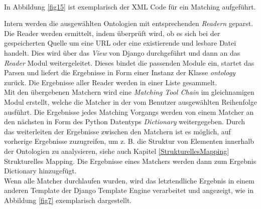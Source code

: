 		\\
		In Abbildung \ref{fig15} ist exemplarisch der XML Code für ein Matching
		aufgeführt.\\
		\begin{minipage}{\linewidth}
			\label{fig15}  
		\end{minipage}
		
		\pagebreak[4]
		
		Intern werden die ausgewählten Ontologien mit entsprechenden
		\textit{Readern} geparst. Die Reader werden ermittelt, indem überprüft wird,
		ob es sich bei der gespeicherten Quelle um eine URL oder eine
		existierende und lesbare Datei handelt. Dies wird über das \textit{View} von
		Django durchgeführt und dann an das \textit{Reader} Modul weitergeleitet. Dieses
		bindet die passenden Module ein, startet das Parsen und liefert die Ergebnisse
		in Form einer Instanz der Klasse \textit{ontology} zurück. Die Ergebnisse
		aller Reader werden in einer Liste gesammelt.\\
		Mit den übergebenen Matchern wird eine \textit{Matching Tool Chain} im
		gleichnamigen Modul erstellt, welche die Matcher in der vom
		Benutzer ausgewählten Reihenfolge ausführt. Die Ergebnisse jedes Matching
		Vorgangs werden von einem Matcher an den nächsten in Form des Python Datentyps \textit{Dictionary}
		weitergegeben. Durch das weiterleiten der Ergebnisse zwischen den Matchern
		ist es möglich, auf vorherige Ergebnisse zuzugreifen, um z. B. die Struktur von
		Elementen innerhalb der Ontologien zu analysieren,
		siehe auch Kapitel \ref{StrukturellesMapping} Strukturelles Mapping.
		Die Ergebnisse eines Matchers werden dann zum Ergebnis Dictionary
		hinzugefügt.\\
		Wenn alle Matcher durchlaufen wurden, wird das letztendliche Ergebnis in einem
		anderen Template der Django Template Engine verarbeitet und angezeigt,
		wie in Abbildung \ref{fig7} exemplarisch dargestellt.
		
